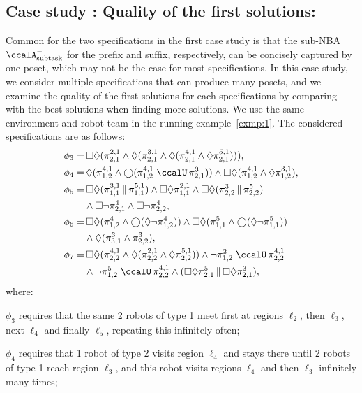 \documentclass[Afour,sageh,times]{sagej}
\newcommand{\auto}[1]{\ccalA_{\textup{#1}}}
\renewcommand{\ap}[3]{\mathcal{\pi}_{{#1},{#2}}^{#3}}
\newcommand{\RNum}[1]{\uppercase\expandafter{\romannumeral #1\relax}}
\begin{document}
{\subsection{Case study \RNum{2}: Quality of the first solutions:} Common for the two specifications in the first case study is that the sub-NBA $\auto{subtask}^-$ for the prefix and suffix, respectively,  can be concisely captured by one poset, which may not be the case for most specifications. In this case study, we consider multiple specifications that can produce many posets, and we examine the quality of the first solutions for each specifications by comparing with the best solutions when finding more solutions. We use the same environment and robot team in the running example~\ref{exmp:1}. The considered specifications are as follows:
\begin{align*}
  \phi_3  = & \, \square \Diamond (\ap{2}{1}{2,1} \wedge \Diamond (\ap{2}{1}{3,1} \wedge \Diamond (\ap{2}{1}{4,1} \wedge \Diamond \ap{2}{1}{5,1}  )   )  ), \\
  \phi_4  = & \, \Diamond (\ap{1}{2}{4,1} \wedge \bigcirc (\ap{1}{2}{4,1} \;\ccalU \, \ap{2}{1}{3})) \wedge \square \Diamond ( \ap{1}{2}{4,1} \wedge \Diamond \ap{1}{2}{3,1}), \\
  \phi_5  = & \,  \square \Diamond (\ap{1}{1}{3,1} \,\|\, \ap{1}{1}{5,1}) \wedge \square \Diamond \ap{1}{1}{2,1}  \wedge \square \Diamond (\ap{2}{2}{3} \,\|\, \ap{2}{2}{5})  \\
   & \wedge \square \neg \ap{2}{1}{4} \wedge \square \neg \ap{2}{2}{4}, \\
  \phi_6  = & \,  \square \Diamond (\ap{1}{2}{4} \wedge \bigcirc (\Diamond \neg \ap{1}{2}{4})) \wedge  \square \Diamond (\ap{1}{1}{5} \wedge \bigcirc (\Diamond \neg \ap{1}{1}{5} )) \\
  & \wedge  \Diamond  (\ap{3}{1}{3} \wedge \ap{2}{2}{3}), \\
  \phi_7 = & \, \square \Diamond  (\ap{2}{2}{4,1} \wedge \Diamond (\ap{2}{2}{2,1} \wedge \Diamond \ap{2}{2}{5,1}))  \wedge  \neg \ap{1}{2}{2} \;\ccalU \, \ap{2}{2}{4,1} \\
  & \wedge \neg \ap{1}{2}{5} \; \ccalU \, \ap{2}{2}{4,1} \wedge (\square \Diamond \ap{2}{1}{5}\, \| \,  \square \Diamond \ap{2}{1}{3}),
 \end{align*}
where:

$\phi_3$ requires that the same 2 robots of type 1 meet first at regions $\ell_2$, then  $\ell_3$, next  $\ell_4$ and finally $\ell_5$, repeating this infinitely often;

$\phi_4$ requires that 1 robot of type 2 visits region $\ell_4$ and stays there until 2 robots of type 1 reach region $\ell_3$, and this robot visits regions $\ell_4$ and then $\ell_3$ infinitely many times;

}
\end{document}
